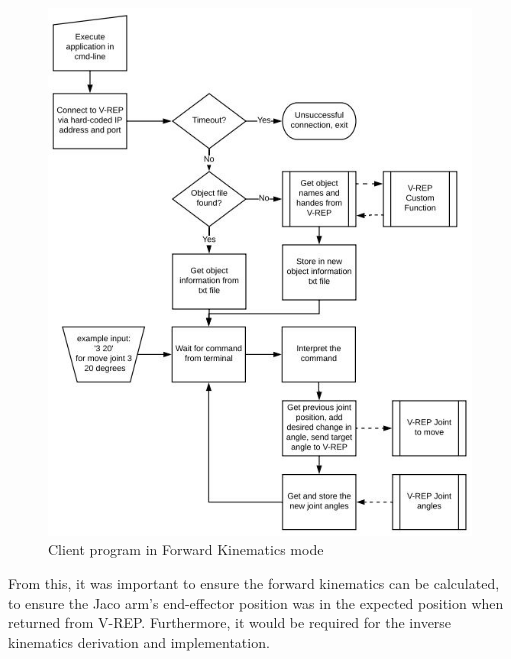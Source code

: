 \documentclass[12pt,openany,a4paper]{book}
\begin{document}
\begin{center}
\begin{figure}[htb]
  \includegraphics[width=\linewidth]{client_fk.jpg}
\caption{Client program in Forward Kinematics mode}
\end{figure}
\end{center}

\vspace{\baselineskip}

From this, it was important to ensure the forward kinematics can be calculated, to ensure the Jaco arm's end-effector position was in the expected position when returned from V-REP. Furthermore, it would be required for the inverse kinematics derivation and implementation. 
\end{document}
